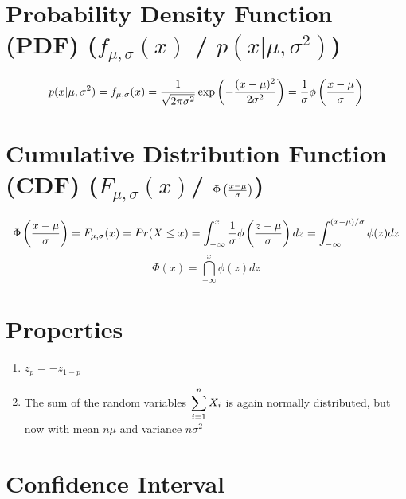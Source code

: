 \section{Probability Density Function (PDF) ($f_{\mu,\sigma}(x)$ / $p(x|\mu,\sigma^2)$) \cite{ism-1,mfml-1}} \label{Normal Distribution: PDF}

\[
    p(x|\mu,\sigma^2)
    = f_{\mu,\sigma}(x)
    = \dfrac{1}{\sqrt{2\pi\sigma^2}}
    \exp\left(
        -\dfrac{(x - \mu)^2}{2\sigma^2}
    \right)
    = \dfrac{1}{\sigma}\phi\left(
        \dfrac{x - \mu}{\sigma}
    \right)
\]


\section{Cumulative Distribution Function (CDF) ($F_{\mu,\sigma}(x)$/ $\Phi\left( \frac{x-\mu}{\sigma} \right)$) \cite{ism-1}} \label{Normal Distribution: CDF}

\[
    \Phi\left(\dfrac{x-\mu}{\sigma}\right)
    = F_{\mu,\sigma}(x)
    = Pr(X \leq x)
    = \displaystyle\int_{-\infty}^x \dfrac{1}{\sigma}\phi\left(
        \dfrac{z - \mu}{\sigma}
    \right) dz
    = \displaystyle\int_{-\infty}^{(x - \mu)/\sigma} \phi(z) dz
\]
\[
    \Phi(x) = \dint_{-\infty}^{x} \phi(z) dz
\]


\section{Properties \cite{ism-1}}

\begin{enumerate}
    \item $z_p = -z_{1-p}$

    \item The sum of the random variables $\displaystyle\sum_{i=1}^{n} X_i$ is again normally distributed, but now with mean $n\mu$ and variance $n\sigma^2$
\end{enumerate}

\section{Confidence Interval \cite{ism-1}}


